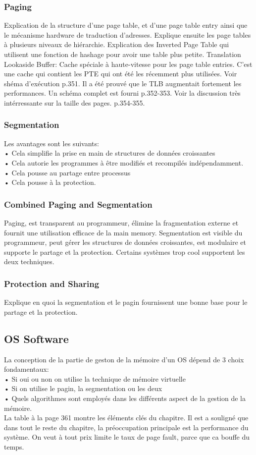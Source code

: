 \subsubsection{Paging}
Explication de la structure d’une page table, et d’une page table entry ainsi que le mécanisme hardware de traduction d’adresses. Explique ensuite les page tables à plusieurs niveaux de hiérarchie. Explication des Inverted Page Table qui utilisent une fonction de hashage pour avoir une table plus petite.
Translation Lookaside Buffer: Cache spéciale à haute-vitesse pour les page table entries. C’est une cache qui contient les PTE qui ont été les récemment plus utilisées. Voir shéma d’exécution p.351. Il a été prouvé que le TLB augmentait fortement les performances. Un schéma complet est fourni p.352-353. Voir la discussion très intérressante sur la taille des pages. p.354-355.
\subsubsection{Segmentation}
Les avantages sont les suivants:\\
• Cela simplifie la prise en main de structures de données croissantes\\
• Cela autorie les programmes à être modifiés et recompilés indépendamment.\\
• Cela pousse au partage entre processus\\
• Cela pousse à la protection.
\subsubsection{Combined Paging and Segmentation}
Paging, est transparent au programmeur, élimine la fragmentation externe et fournit une utilisation efficace de la main memory.
Segmentation est visible du programmeur, peut gérer les structures de données croissantes, est modulaire et supporte le partage et la protection.
Certains systèmes trop cool supportent les deux techniques.
\subsubsection{Protection and Sharing}
Explique en quoi la segmentation et le pagin fournissent une bonne base pour le partage et la protection.
\subsection{OS Software}
La conception de la partie de geston de la mémoire d’un OS dépend de 3 choix fondamentaux:\\
• Si oui ou non on utilise la technique de mémoire virtuelle\\
• Si on utilise le pagin, la segmentation ou les deux\\
• Quels algorithmes sont employés dans les différents aspect de la gestion de la mémoire.\\
La table à la page 361 montre les éléments clés du chapitre. Il est a souligné que dans tout le reste du chapitre, la préoccupation principale est la performance du système. On veut à tout prix limite le taux de page fault, parce que ca bouffe du temps.
